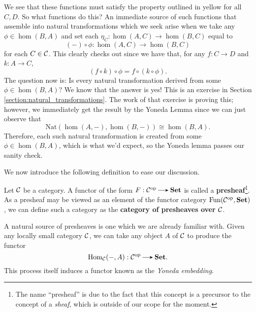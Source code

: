 \begin{example}
\begin{center}
        \end{center}        
        We see that these functions must satisfy the 
        property outlined in yellow for all $C,D$. So 
        what functions do this?
        An immediate source of such functions that 
        assemble into natural transformations which we 
        seek arise when we take any $\phi \in \hom(B,A)$ and set 
        each $\eta_C : \hom(A,C) \to \hom(B,C)$ equal to 
        \[
            (-) \circ \phi : \hom(A,C) \to \hom(B,C)
        \]
        for each $C \in \mathcal{C}$. This clearly checks out since we  
        have that, for any $f: C \to D$ and $k: A\to C$,  
        \[
            (f \circ k)\circ \phi = f  \circ (k \circ \phi).
        \]
        The question now is: Is every natural transformation 
        derived from some $\phi  \in  \hom(B,A)$? We know that the answer 
        is yes! This is an exercise in Section \ref{section:natural_transformations}. 
        The work of that exercise is proving this; however, 
        we  immediately get the  result 
        by the Yoneda Lemma since we can just observe that
        \[
            \text{Nat}(\hom(A, -), \hom(B, -))
            \cong
            \hom(B, A).   
        \]
        Therefore, each  such natural transformation is created from 
        some $\phi  \in  \hom(B,A)$,  which is what we'd expect,
        so the Yoneda lemma passes our sanity check.

    \end{example}

    We now introduce the following definition to ease our discussion. 
    \begin{definition}
        Let $\mathcal{C}$ be a category. A functor of the form $F: \cc\op \to \textbf{Set}$ 
        is called a \textbf{presheaf}\footnote{The name ``presheaf'' is due to the 
        fact that this concept is a 
        precursor to the concept of a \emph{sheaf}, which is outside of our scope 
        for the moment. }. As a presheaf may be viewed as an element 
        of the functor category $\text{Fun}(\mathcal{C}^{\mathrm{op}}, \textbf{Set})$, we can define such a category 
        as the \textbf{category of presheaves over $\mathcal{C}$}. 
    \end{definition}

    A natural source of presheaves is one which we are already familiar with. 
    Given any locally small category $\mathcal{C}$, we can take any 
    object $A$ of $\mathcal{C}$ to produce the functor 
    \[
        \hom_{\cc}(-, A): \cc\op \to \textbf{Set}.
    \]
    This process itself induces a functor known as the \emph{Yoneda embedding}.

